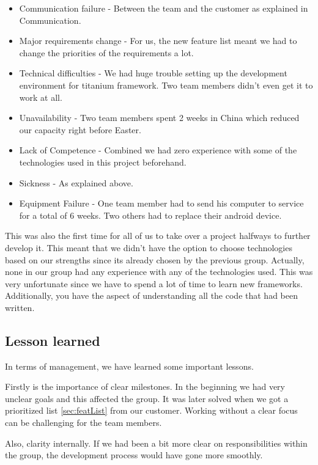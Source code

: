 \begin{itemize}
	\item Communication failure - Between the team and the customer as explained in Communication.
	\item Major requirements change - For us, the new feature list meant we had to change the priorities of the requirements a lot.
	\item Technical difficulties - We had huge trouble setting up the development environment for titanium framework. Two team members didn't even get it to work at all.
	\item Unavailability - Two team members spent 2 weeks in China which reduced our capacity right before Easter. 
	\item Lack of Competence - Combined we had zero experience with some of the technologies used in this project beforehand.
	\item Sickness - As explained above.
	\item Equipment Failure - One team member had to send his computer to service for a total of 6 weeks. Two others had to replace their android device. 
\end{itemize}

This was also the first time for all of us to take over a project halfways to further develop it. This meant that we didn't have the option to choose technologies based on our strengths since its already chosen by the previous group. Actually, none in our group had any experience with any of the technologies used. This was very unfortunate since we have to spend a lot of time to learn new frameworks. Additionally, you have the aspect of understanding all the code that had been written. 

	\subsection{Lesson learned}

In terms of management, we have learned some important lessons.

Firstly is the importance of clear milestones. In the beginning we had very unclear goals and this affected the group. It was later solved when we got a prioritized list \ref{sec:featList} from our customer. Working without a clear focus can be challenging for the team members.

Also, clarity internally. If we had been a bit more clear on responsibilities within the group, the development process would have gone more smoothly.

